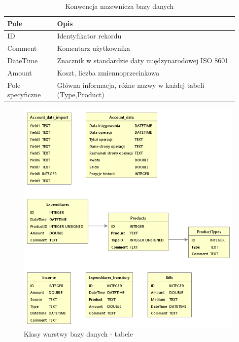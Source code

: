 \documentclass[a4paper,10pt]{report}
\newcommand{\customstyletable}[1]{\footnotesize{\textbf{#1}}}
\begin{document}
\begin{table}[h]
    \footnotesize
    \begin{tabular}{|p{0.2\linewidth}|p{0.73\linewidth}|}  %
    \hline                  %
    \customstyletable{Pole} & \customstyletable{Opis} \\
    \hline
    {ID} & {Identyfikator rekordu}\\
    \hline
    {Comment} & {Komentarz użytkownika}\\
    \hline
    {DateTime} & {Znacznik w standardzie daty międzynarodowej ISO 8601 \cite{ISO 8601}}\\
    \hline
    {Amount} & {Koszt, liczba zmiennoprzecinkowa}\\
    \hline
    {Pole specyficzne} & {Główna informacja, różne nazwy w każdej tabeli (Type,Product)}\\
    \hline
    \end{tabular}
    \caption{Konwencja nazewnicza bazy danych }
\end{table}

\begin{figure}[H]           %
    \caption{Klasy warstwy bazy danych - tabele}
    \label{fig:Klasy warstwy bazy danych - tabele}
    \centering  
    \includegraphics[width=12cm]{figures/Budgeter_Finances-db_Tables.png}
\end{figure}
\end{document}
